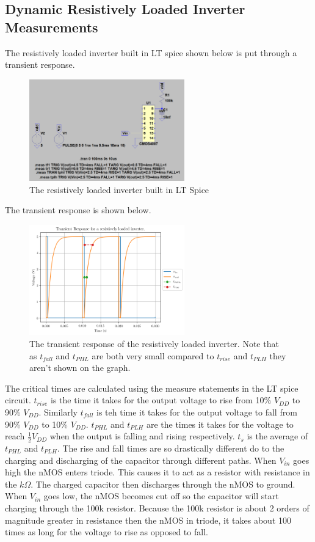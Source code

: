 \documentclass[titlepage, 12pt]{article}
\begin{document}
    \subsection{Dynamic Resistively Loaded Inverter Measurements}
    The resistively loaded inverter built in LT spice shown below is put
    through a transient response.
    \begin{figure}[H]
        \centering
        \includegraphics[width=0.6\textwidth]{figures/part_3a_circ.png}
        \caption{The resistively loaded inverter built in LT Spice}
    \end{figure}
    The transient response is shown below.
    \begin{figure}[H]
        \centering
        \includegraphics[width=0.6\textwidth]{figures/part_3a.png}
        \caption{The transient response of the resistively loaded
            inverter. Note that as $t_{fall}$ and $t_{PHL}$ are both
            very small compared to $t_{rise}$ and $t_{PLH}$ they aren't
        shown on the graph.}
    \end{figure}
    The critical times are calculated using the measure statements in
    the LT spice circuit. $t_{rise}$ is the time it takes for the
    output voltage to rise from 10\% $V_{DD}$ to 90\% $V_{DD}$.
    Similarly $t_{fall}$ is teh time it takes for the output voltage to
    fall from 90\% $V_{DD}$ to 10\% $V_{DD}$. $t_{PHL}$ and $t_{PLH}$
    are the times it takes for the voltage to reach $\frac{1}{2}V_{DD}$
    when the output is falling and rising respectively. $t_s$ is the
    average of $t_{PHL}$ and $t_{PLH}$. The rise and fall times are so
    drastically different do to the charging and discharging of the
    capacitor through different paths. When $V_{in}$ goes high the
    nMOS enters triode. This causes it to act as a resistor with
    resistance in the $k\Omega$. The charged capacitor then discharges
    through the nMOS to ground. When $V_{in}$ goes low, the nMOS becomes
    cut off so the capacitor will start charging through the 100k
    resistor. Because the 100k resistor is about 2 orders of magnitude
    greater in resistance then the nMOS in triode, it takes about 100
    times as long for the voltage to rise as opposed to fall.
\end{document}
